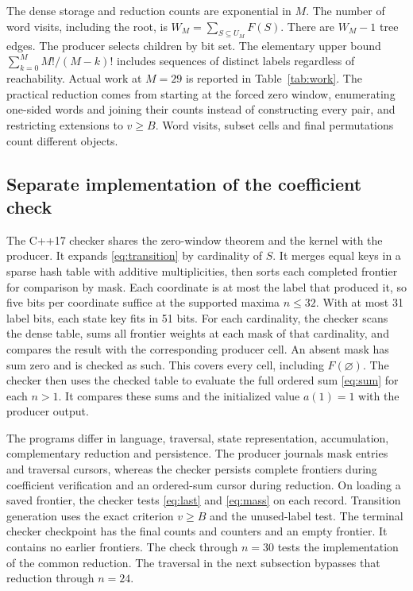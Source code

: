 \documentclass[11pt]{article}
\begin{document}
The dense storage and reduction counts are exponential in \(M\).
The number of word visits, including the root, is
\(W_M=\sum_{S\subseteq U_M}F(S)\). There are \(W_M-1\) tree edges.
The producer selects children by bit set. The elementary upper bound
\(\sum_{k=0}^M M!/(M-k)!\) includes sequences of distinct labels
regardless of reachability. Actual work at \(M=29\) is reported
in Table~\ref{tab:work}.
The practical reduction comes from starting at the forced zero window,
enumerating one-sided words and joining their counts instead of
constructing every pair, and restricting extensions to \(v\ge B\).
Word visits, subset cells and
final permutations count different objects.

\subsection{Separate implementation of the coefficient check}

The C++17 checker shares the zero-window theorem and the kernel with the
producer. It expands \eqref{eq:transition} by cardinality of \(S\).
It merges equal keys in a sparse hash table with additive multiplicities,
then sorts each completed frontier for comparison by mask. Each
coordinate is at most the label that produced it, so five bits per
coordinate suffice at the supported maxima \(n\le32\). With at most
31 label bits, each state key fits in 51 bits. For each cardinality,
the checker scans the dense table, sums all frontier weights at each
mask of that cardinality, and compares the result with the corresponding
producer cell. An absent mask has sum zero and is checked as such.
This covers every cell, including \(F(\varnothing)\).
The checker then uses the checked table to evaluate the full ordered sum
\eqref{eq:sum} for each \(n>1\). It compares these sums and the
initialized value \(a(1)=1\) with the producer output.

The programs differ in language, traversal, state representation, accumulation,
complementary reduction and persistence. The producer journals mask entries
and traversal cursors, whereas the checker persists complete frontiers during
coefficient verification and an ordered-sum cursor during reduction.
On loading a saved frontier, the checker tests \eqref{eq:last}
and \eqref{eq:mass} on each record. Transition generation uses the exact
criterion \(v\ge B\) and the unused-label test. The terminal checker
checkpoint has the final counts and counters and an empty frontier. It
contains no earlier frontiers. The check through \(n=30\) tests the
implementation of the common reduction. The traversal in the next
subsection bypasses that reduction through \(n=24\).
\end{document}
